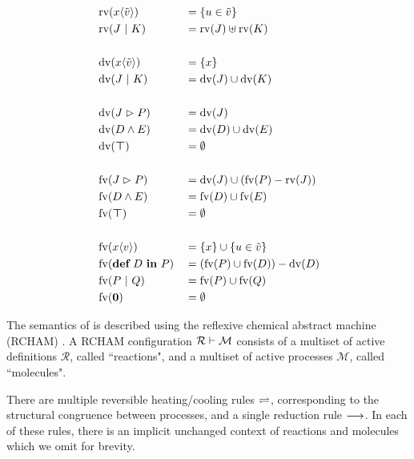 \begin{alignat*}{2}
  & \operatorname{rv}(x\langle\tilde{v}\rangle) & &= \{ u \in \tilde{v} \} \\
  & \operatorname{rv}(J \ |\  K)           & &= \operatorname{rv}(J) \uplus \operatorname{rv}(K) \\
  \\
  & \operatorname{dv}(x\langle\tilde{v}\rangle) & &= \{ x \} \\
  & \operatorname{dv}(J \ |\  K)           & &= \operatorname{dv}(J) \cup \operatorname{dv}(K) \\
  \\
  & \operatorname{dv}(J \vartriangleright P)         & &= \operatorname{dv}(J) \\
  & \operatorname{dv}(D \wedge E)           & &= \operatorname{dv}(D) \cup \operatorname{dv}(E) \\
  & \operatorname{dv}(\boldsymbol{\top})           & &= \emptyset \\
  \\
  & \operatorname{fv}(J \vartriangleright P)         & &= \operatorname{dv}(J) \cup (\operatorname{fv}(P) - \operatorname{rv}(J)) \\
  & \operatorname{fv}(D \wedge E)           & &= \operatorname{fv}(D) \cup \operatorname{fv}(E) \\
  & \operatorname{fv}(\boldsymbol{\top})           & &= \emptyset \\
  \\
  & \operatorname{fv}(x\langle v\rangle)         & &= \{ x \} \cup \{ u \in \tilde{v} \} \\
  & \operatorname{fv}(\textbf{def} \ D \ \textbf{in} \ P)         & &= (\operatorname{fv}(P) \cup \operatorname{fv}(D)) - \operatorname{dv}(D) \\
  & \operatorname{fv}(P \ |\  Q)           & &= \operatorname{fv}(P) \cup \operatorname{fv}(Q) \\
  & \operatorname{fv}(\textbf{0})          & &= \emptyset \\
\end{alignat*}



The semantics of \joincalc is described using the reflexive chemical abstract
machine (RCHAM) \cite{fournet_reflexive_1996}.
A RCHAM configuration
$ \rchamcnf{\mathcal{R}}{\mathcal{M}} $
consists of a multiset of active definitions $\mathcal{R}$,
called ``reactions",
and a multiset of active processes $\mathcal{M}$,
called ``molecules".

There are multiple reversible heating/cooling rules $\rightleftharpoons$,
corresponding to the structural congruence between processes,
and a single reduction rule $\longrightarrow$.
In each of these rules, there is an implicit unchanged context of reactions and
molecules which we omit for brevity.

